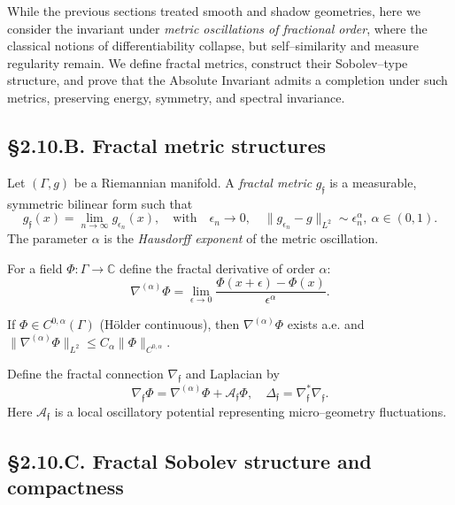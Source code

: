 While the previous sections treated smooth and shadow geometries, here we consider the invariant under
\emph{metric oscillations of fractional order}, where the classical notions of differentiability collapse,
but self–similarity and measure regularity remain.
We define fractal metrics, construct their Sobolev–type structure, and prove that the Absolute Invariant
admits a completion under such metrics, preserving energy, symmetry, and spectral invariance.

\subsection*{§2.10.B. Fractal metric structures}

\begin{definition}
Let $(\Gamma,g)$ be a Riemannian manifold.
A \emph{fractal metric} $g_\mathfrak{f}$ is a measurable, symmetric bilinear form such that
\[
g_\mathfrak{f}(x)=\lim_{n\to\infty} g_{\epsilon_n}(x),
\quad \text{with}\quad
\epsilon_n\to0,\quad
\|g_{\epsilon_n}-g\|_{L^2}\sim \epsilon_n^{\alpha},\ \alpha\in(0,1).
\]
\]
The parameter $\alpha$ is the \emph{Hausdorff exponent} of the metric oscillation.
\end{definition}

\begin{definition}
For a field $\Phi:\Gamma\to\mathbb{C}$ define the fractal derivative of order $\alpha$:
\[
\nabla^{(\alpha)}\Phi
=\lim_{\epsilon\to0}\frac{\Phi(x+\epsilon)-\Phi(x)}{\epsilon^\alpha}.
\]
\]
\end{definition}

\begin{lemma}
If $\Phi\in C^{0,\alpha}(\Gamma)$ (Hölder continuous), then $\nabla^{(\alpha)}\Phi$ exists a.e. and
$\|\nabla^{(\alpha)}\Phi\|_{L^2}\le C_\alpha\|\Phi\|_{C^{0,\alpha}}$.
\end{lemma}

\begin{definition}
Define the fractal connection $\nabla_\mathfrak{f}$ and Laplacian by
\[
\nabla_\mathfrak{f}\Phi=\nabla^{(\alpha)}\Phi + \mathcal{A}_\mathfrak{f}\Phi,\quad
\Delta_\mathfrak{f}=\nabla_\mathfrak{f}^\ast\nabla_\mathfrak{f}.
\]
Here $\mathcal{A}_\mathfrak{f}$ is a local oscillatory potential representing micro–geometry fluctuations.
\end{definition}

\subsection*{§2.10.C. Fractal Sobolev structure and compactness}

